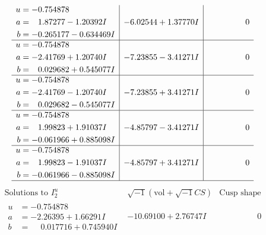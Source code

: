 \documentclass[1p]{elsarticle_modified}
\theoremstyle{definition}
\newcommand{\I}{\sqrt{-1}}
\begin{document}
$$\begin{array}{c|c|c}
\begin{aligned}
u &= -0.754878\phantom{ +0.000000I} \\
a &= \phantom{-}1.87277 - 1.20392 I \\
b &= -0.265177 - 0.634469 I\end{aligned}
 & -6.02544 + 1.37770 I & \phantom{-0.000000 } 0 \\ \hline\begin{aligned}
u &= -0.754878\phantom{ +0.000000I} \\
a &= -2.41769 + 1.20740 I \\
b &= \phantom{-}0.029682 + 0.545077 I\end{aligned}
 & -7.23855 - 3.41271 I & \phantom{-0.000000 } 0 \\ \hline\begin{aligned}
u &= -0.754878\phantom{ +0.000000I} \\
a &= -2.41769 - 1.20740 I \\
b &= \phantom{-}0.029682 - 0.545077 I\end{aligned}
 & -7.23855 + 3.41271 I & \phantom{-0.000000 } 0 \\ \hline\begin{aligned}
u &= -0.754878\phantom{ +0.000000I} \\
a &= \phantom{-}1.99823 + 1.91037 I \\
b &= -0.061966 + 0.885098 I\end{aligned}
 & -4.85797 - 3.41271 I & \phantom{-0.000000 } 0 \\ \hline\begin{aligned}
u &= -0.754878\phantom{ +0.000000I} \\
a &= \phantom{-}1.99823 - 1.91037 I \\
b &= -0.061966 - 0.885098 I\end{aligned}
 & -4.85797 + 3.41271 I & \phantom{-0.000000 } 0\\
 \hline 
 \end{array}$$\newpage$$\begin{array}{c|c|c}  
\text{Solutions to }I^u_{2}& \I (\text{vol} + \sqrt{-1}CS) & \text{Cusp shape}\\
 \hline 
\begin{aligned}
u &= -0.754878\phantom{ +0.000000I} \\
a &= -2.26395 + 1.66291 I \\
b &= \phantom{-}0.017716 + 0.745940 I\end{aligned}
 & -10.69100 + 2.76747 I & \phantom{-0.000000 } 0 \\ \hline\begin{aligned}

\end{aligned}
\end{array}$$
\end{document}
